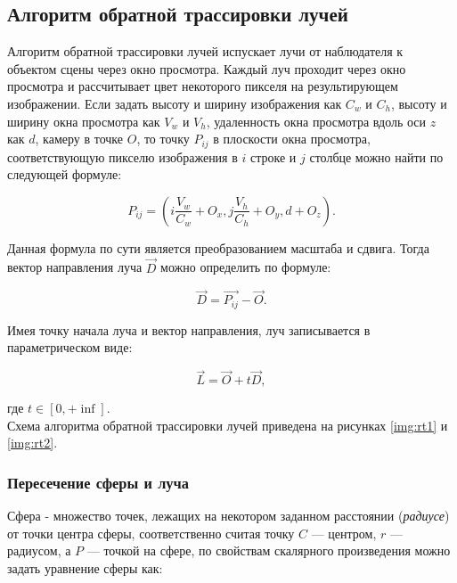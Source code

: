\subsection{Алгоритм обратной трассировки лучей}

Алгоритм обратной трассировки лучей испускает лучи от наблюдателя к объектом сцены через окно просмотра. Каждый луч проходит через окно просмотра и рассчитывает цвет некоторого пикселя на результирующем изображении. Если задать высоту и ширину изображения как $C_w$ и $C_h$, высоту и ширину окна просмотра как $V_w$ и $V_h$, удаленность окна просмотра вдоль оси $z$ как $d$, камеру в точке $O$, то точку $P_{ij}$ в плоскости окна просмотра, соответствующую пикселю изображения в $i$ строке и $j$ столбце можно найти по следующей формуле:

\begin{equation}
	P_{ij} = \left(i \frac{V_w}{C_w} + O_x, j \frac{V_h}{C_h} + O_y, d + O_z\right).
\end{equation}

Данная формула по сути является преобразованием масштаба и сдвига. Тогда вектор направления луча $\vec{D}$ можно определить по формуле:

\begin{equation}
	\vec{D} = \vec{P_{ij}} - \vec{O}.
\end{equation}

Имея точку начала луча и вектор направления, луч записывается в параметрическом виде:

\begin{equation}
	\label{eq:ray_formula}
	\vec{L} = \vec{O} + t\vec{D},
\end{equation}

где $t \in [0, +\inf]$.\\

Схема алгоритма обратной трассировки лучей приведена на рисунках \ref{img:rt1} и \ref{img:rt2}.



\clearpage

\subsubsection{Пересечение сферы и луча}

Сфера - множество точек, лежащих на некотором заданном расстоянии (\textit{радиусе}) от точки центра сферы, соответственно считая точку $C$ --- центром, $r$ --- радиусом, а $P$ --- точкой на сфере, по свойствам скалярного произведения можно задать уравнение сферы как:



